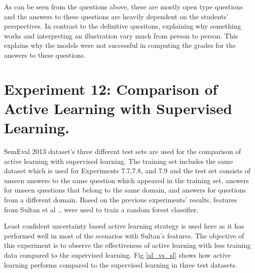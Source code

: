 As can be seen from the questions above, these are mostly open type questions and the answers to these questions are heavily dependent on the students' perspectives. In contrast to the definitive quesitons, explaining why something works and interpreting an illustration vary much from person to person. This explains why the models were not successful in computing the grades for the answers to these questions.  


\clearpage

\section{Experiment 12: Comparison of Active Learning with Supervised Learning.}

SemEval 2013 dataset's three different test sets are used for the comparison of active learning with supervised learning. The training set includes the same dataset which is used for Experiments 7.7,7.8, and 7.9 and the test set consists of unseen answers to the same question which appeared in the training set, answers for unseen questions that belong to the same domain, and answers for questions from a different domain. Based on the previous experiments' results, features from Sultan et al \cite{Sultan2016}., were used to train a random forest classifier. 

Least confident uncertainty based active learning strategy is used here as it has performed well in most of the scenarios with Sultan's features. The objective of this experiment is to observe the effectiveness of active learning with less training data compared to the supervised learning. Fig \ref{al_vs_sl} shows how active learning performs compared to the supervised learning in three test datasets. 

